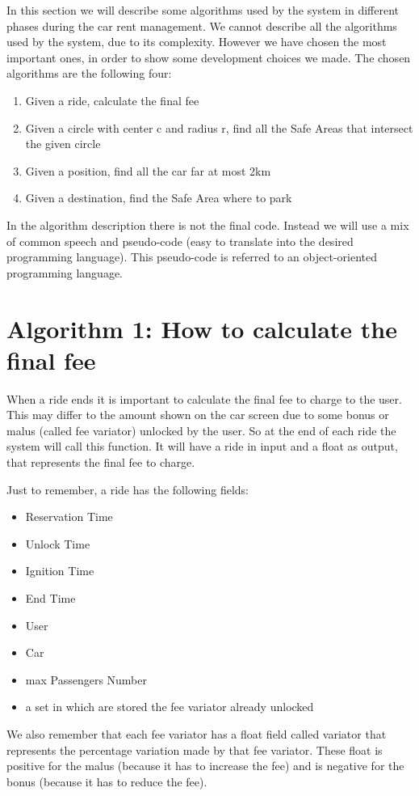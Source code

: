 In this section we will describe some algorithms used by the system in different phases during the car rent management. We cannot describe all the algorithms used by the system, due to its complexity. However we have chosen the most important ones, in order to show some development choices we made.
The chosen algorithms are the following four:
\begin{enumerate}
\item Given a ride, calculate the final fee
\item Given a circle with center c and radius r, find all the Safe Areas that intersect the given circle
\item Given a position, find all the car far at most 2km
\item Given a destination, find the Safe Area where to park
\end{enumerate}
In the algorithm description there is not the final code. Instead we will use a mix of common speech and pseudo-code (easy to translate into the desired programming language). This pseudo-code is referred to an object-oriented programming language.

\section{Algorithm 1: How to calculate the final fee}
When a ride ends it is important to calculate the final fee to charge to the user. This may differ to the amount shown on the car screen due to some bonus or malus (called fee variator) unlocked by the user.
So at the end of each ride the system will call this function. It will have a ride in input and a float as output, that represents the final fee to charge.

Just to remember, a ride has the following fields:
\begin{itemize}
\item Reservation Time
\item Unlock Time
\item Ignition Time
\item End Time
\item User
\item Car
\item max Passengers Number
\item a set in which are stored the fee variator already unlocked
\end{itemize}

We also remember that each fee variator has a float field called variator that represents the percentage variation made by that fee variator. These float is positive for the malus (because it has to increase the fee) and is negative for the bonus (because it has to reduce the fee).

